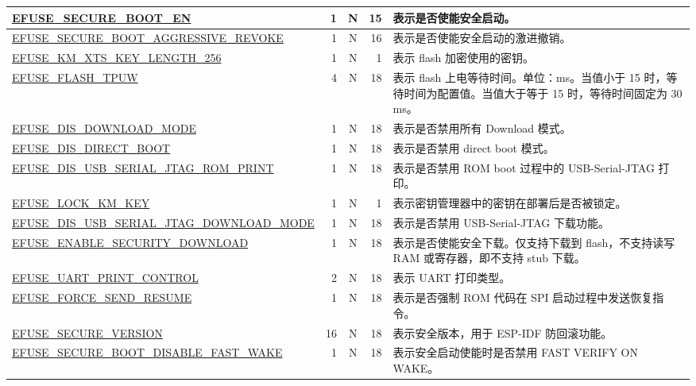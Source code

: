 \begin{longtable}[l]{ |m{8.5cm}|r|c|r|m{9.0cm}| }
    \hyperref[fielddesc:EFUSESECUREBOOTEN]{EFUSE\_SECURE\_BOOT\_EN} & 1 & N & 15 & 表示是否使能安全启动。\\
    \hline
    \hyperref[fielddesc:EFUSESECUREBOOTAGGRESSIVEREVOKE]{EFUSE\_SECURE\_BOOT\_AGGRESSIVE\_REVOKE} & 1 & N & 16 & 表示是否使能安全启动的激进撤销。\\
    \hline
    \hyperref[fielddesc:EFUSEKMXTSKEYLENGTH256]{EFUSE\_KM\_XTS\_KEY\_LENGTH\_256} & 1 & N & 1 & 表示 flash 加密使用的密钥。 \\ \hline
    \hyperref[fielddesc:EFUSEFLASHTPUW]{EFUSE\_FLASH\_TPUW} & 4 & N & 18 & 表示 flash 上电等待时间。单位：ms。当值小于 15 时，等待时间为配置值。当值大于等于 15 时，等待时间固定为 30 ms。\\
    \hline
    \hyperref[fielddesc:EFUSEDISDOWNLOADMODE]{EFUSE\_DIS\_DOWNLOAD\_MODE} & 1 & N & 18 & 表示是否禁用所有 Download 模式。\\
    \hline
    \hyperref[fielddesc:EFUSEDISDIRECTBOOT]{EFUSE\_DIS\_DIRECT\_BOOT} & 1 & N & 18 & 表示是否禁用 direct boot 模式。\\
    \hline
    \hyperref[fielddesc:EFUSEDISUSBSERIALJTAGROMPRINT]{EFUSE\_DIS\_USB\_SERIAL\_JTAG\_ROM\_PRINT} & 1 & N & 18 & 表示是否禁用 ROM boot 过程中的 USB-Serial-JTAG 打印。\\
    \hline
    \hyperref[fielddesc:EFUSELOCKKMKEY]{EFUSE\_LOCK\_KM\_KEY} & 1 & N & 1 & 表示密钥管理器中的密钥在部署后是否被锁定。 \\ \hline
    \hyperref[fielddesc:EFUSEDISUSBSERIALJTAGDOWNLOADMODE]{EFUSE\_DIS\_USB\_SERIAL\_JTAG\_DOWNLOAD\_MODE} & 1 & N & 18 & 表示是否禁用 USB-Serial-JTAG 下载功能。\\
    \hline
    \hyperref[fielddesc:EFUSEENABLESECURITYDOWNLOAD]{EFUSE\_ENABLE\_SECURITY\_DOWNLOAD} & 1 & N & 18 & 表示是否使能安全下载。仅支持下载到 flash，不支持读写 RAM 或寄存器，即不支持 stub 下载。\\
    \hline
    \hyperref[fielddesc:EFUSEUARTPRINTCONTROL]{EFUSE\_UART\_PRINT\_CONTROL} & 2 & N & 18 & 表示 UART 打印类型。\\
    \hline
    \hyperref[fielddesc:EFUSEFORCESENDRESUME]{EFUSE\_FORCE\_SEND\_RESUME} & 1 & N & 18 & 表示是否强制 ROM 代码在 SPI 启动过程中发送恢复指令。\\
    \hline
    \hyperref[fielddesc:EFUSESECUREVERSION]{EFUSE\_SECURE\_VERSION} & 16 & N & 18 & 表示安全版本，用于 ESP-IDF 防回滚功能。\\
    \hline
    \hyperref[fielddesc:EFUSESECUREBOOTDISABLEFASTWAKE]{EFUSE\_SECURE\_BOOT\_DISABLE\_FAST\_WAKE} & 1 & N & 18 & 表示安全启动使能时是否禁用 FAST VERIFY ON WAKE。\\

\end{longtable}
